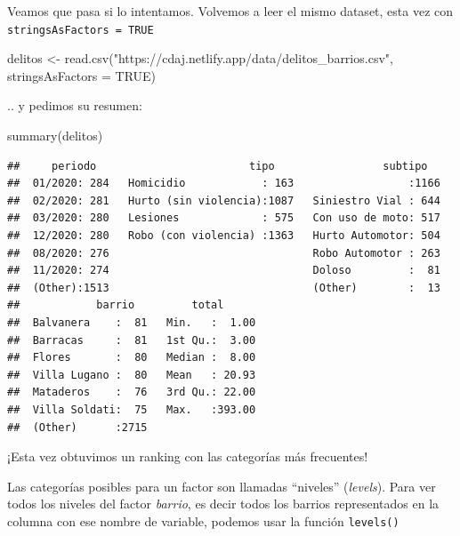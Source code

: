 \documentclass[
]{book}
\newenvironment{Shaded}{\begin{snugshade}}{\end{snugshade}}
\newcommand{\AttributeTok}[1]{\textcolor[rgb]{0.77,0.63,0.00}{#1}}
\newcommand{\ConstantTok}[1]{\textcolor[rgb]{0.00,0.00,0.00}{#1}}
\newcommand{\FunctionTok}[1]{\textcolor[rgb]{0.00,0.00,0.00}{#1}}
\newcommand{\NormalTok}[1]{#1}
\newcommand{\OtherTok}[1]{\textcolor[rgb]{0.56,0.35,0.01}{#1}}
\newcommand{\SpecialCharTok}[1]{\textcolor[rgb]{0.00,0.00,0.00}{#1}}
\newcommand{\StringTok}[1]{\textcolor[rgb]{0.31,0.60,0.02}{#1}}
\begin{document}
Veamos que pasa si lo intentamos. Volvemos a leer el mismo dataset, esta vez con \texttt{stringsAsFactors\ =\ TRUE}

\begin{Shaded}
\begin{Highlighting}[]
\NormalTok{delitos }\OtherTok{\textless{}{-}} \FunctionTok{read.csv}\NormalTok{(}\StringTok{"https://cdaj.netlify.app/data/delitos\_barrios.csv"}\NormalTok{, }\AttributeTok{stringsAsFactors =} \ConstantTok{TRUE}\NormalTok{)}
\end{Highlighting}
\end{Shaded}

.. y pedimos su resumen:

\begin{Shaded}
\begin{Highlighting}[]
\FunctionTok{summary}\NormalTok{(delitos)}
\end{Highlighting}
\end{Shaded}

\begin{verbatim}
##     periodo                        tipo                 subtipo    
##  01/2020: 284   Homicidio            : 163                  :1166  
##  02/2020: 281   Hurto (sin violencia):1087   Siniestro Vial : 644  
##  03/2020: 280   Lesiones             : 575   Con uso de moto: 517  
##  12/2020: 280   Robo (con violencia) :1363   Hurto Automotor: 504  
##  08/2020: 276                                Robo Automotor : 263  
##  11/2020: 274                                Doloso         :  81  
##  (Other):1513                                (Other)        :  13  
##            barrio         total       
##  Balvanera    :  81   Min.   :  1.00  
##  Barracas     :  81   1st Qu.:  3.00  
##  Flores       :  80   Median :  8.00  
##  Villa Lugano :  80   Mean   : 20.93  
##  Mataderos    :  76   3rd Qu.: 22.00  
##  Villa Soldati:  75   Max.   :393.00  
##  (Other)      :2715
\end{verbatim}

¡Esta vez obtuvimos un ranking con las categorías más frecuentes!

Las categorías posibles para un factor son llamadas ``niveles'' (\emph{levels}). Para ver todos los niveles del factor \emph{barrio}, es decir todos los barrios representados en la columna con ese nombre de variable, podemos usar la función \texttt{levels()}

\begin{Shaded}
\end{Shaded}
\end{document}
